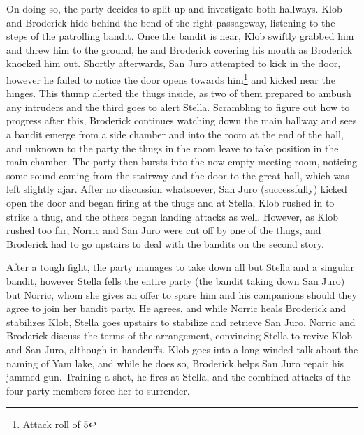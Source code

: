 On doing so, the party decides to split up and investigate both hallways. Klob and Broderick hide behind the bend of the right passageway, listening to the steps of the patrolling bandit. Once the bandit is near, Klob swiftly grabbed him and threw him to the ground, he and Broderick covering his mouth as Broderick knocked him out. Shortly afterwards, San Juro attempted to kick in the door, however he failed to notice the door opens towards him\footnote{Attack roll of 5} and kicked near the hinges. This thump alerted the thugs inside, as two of them prepared to ambush any intruders and the third goes to alert Stella. Scrambling to figure out how to progress after this, Broderick continues watching down the main hallway and sees a bandit emerge from a side chamber and into the room at the end of the hall, and unknown to the party the thugs in the room leave to take position in the main chamber. The party then bursts into the now-empty meeting room, noticing some sound coming from the stairway and the door to the great hall, which was left slightly ajar. After no discussion whatsoever, San Juro (successfully) kicked open the door and began firing at the thugs and at Stella, Klob rushed in to strike a thug, and the others began landing attacks as well. However, as Klob rushed too far, Norric and San Juro were cut off by one of the thugs, and Broderick had to go upstairs to deal with the bandits on the second story. 

After a tough fight, the party manages to take down all but Stella and a singular bandit, however Stella fells the entire party (the bandit taking down San Juro) but Norric, whom she gives an offer to spare him and his companions should they agree to join her bandit party. He agrees, and while Norric heals Broderick and stabilizes Klob, Stella goes upstairs to stabilize and retrieve San Juro. Norric and Broderick discuss the terms of the arrangement, convincing Stella to revive Klob and San Juro, although in handcuffs. Klob goes into a long-winded talk about the naming of Yam lake, and while he does so, Broderick helps San Juro repair his jammed gun. Training a shot, he fires at Stella, and the combined attacks of the four party members force her to surrender. 

